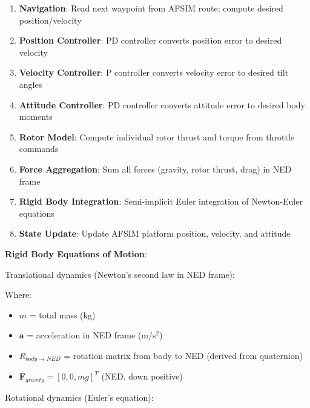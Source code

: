 \begin{enumerate}
	\item \unclass \textbf{Navigation}: Read next waypoint from AFSIM route; compute desired position/velocity
	\item \unclass \textbf{Position Controller}: PD controller converts position error to desired velocity
	\item \unclass \textbf{Velocity Controller}: P controller converts velocity error to desired tilt angles
	\item \unclass \textbf{Attitude Controller}: PD controller converts attitude error to desired body moments
	\item \unclass \textbf{Rotor Model}: Compute individual rotor thrust and torque from throttle commands
	\item \unclass \textbf{Force Aggregation}: Sum all forces (gravity, rotor thrust, drag) in NED frame
	\item \unclass \textbf{Rigid Body Integration}: Semi-implicit Euler integration of Newton-Euler equations
	\item \unclass \textbf{State Update}: Update AFSIM platform position, velocity, and attitude
\end{enumerate}

\unclass \textbf{Rigid Body Equations of Motion}:

\unclass Translational dynamics (Newton's second law in NED frame):


\unclass Where:
\begin{itemize}
	\item \unclass $m$ = total mass (kg)
	\item \unclass $\mathbf{a}$ = acceleration in NED frame (m/s$^2$)
	\item \unclass $R_{body \to NED}$ = rotation matrix from body to NED (derived from quaternion)
	\item \unclass $\mathbf{F}_{gravity} = [0, 0, mg]^T$ (NED, down positive)
\end{itemize}

\unclass Rotational dynamics (Euler's equation):


